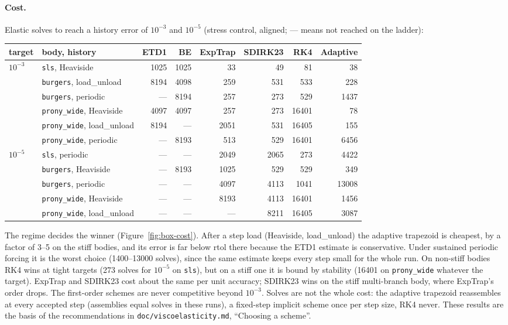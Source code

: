 \documentclass[11pt]{article}
\numberwithin{equation}{section}
\newcommand{\code}[1]{\texttt{#1}}
\begin{document}
\paragraph{Cost.}
Elastic solves to reach a history error of $10^{-3}$ and $10^{-5}$
(stress control, aligned; --- means not reached on the ladder):
\begin{center}
\small
\begin{tabular}{@{}llrrrrrr@{}}
\toprule
target & body, history & ETD1 & BE & ExpTrap & SDIRK23 & RK4 & Adaptive \\
\midrule
$10^{-3}$ & \code{sls}, Heaviside & 1025 & 1025 & 33 & 49 & 81 & 38 \\
 & \code{burgers}, load\_unload & 8194 & 4098 & 259 & 531 & 533 & 228 \\
 & \code{burgers}, periodic & --- & 8194 & 257 & 273 & 529 & 1437 \\
 & \code{prony\_wide}, Heaviside & 4097 & 4097 & 257 & 273 & 16401 & 78 \\
 & \code{prony\_wide}, load\_unload & 8194 & --- & 2051 & 531 & 16405 & 155 \\
 & \code{prony\_wide}, periodic & --- & 8193 & 513 & 529 & 16401 & 6456 \\
\midrule
$10^{-5}$ & \code{sls}, periodic & --- & --- & 2049 & 2065 & 273 & 4422 \\
 & \code{burgers}, Heaviside & --- & 8193 & 1025 & 529 & 529 & 349 \\
 & \code{burgers}, periodic & --- & --- & 4097 & 4113 & 1041 & 13008 \\
 & \code{prony\_wide}, Heaviside & --- & --- & 8193 & 4113 & 16401 & 1456 \\
 & \code{prony\_wide}, load\_unload & --- & --- & --- & 8211 & 16405 & 3087 \\
\bottomrule
\end{tabular}
\end{center}
The regime decides the winner (Figure~\ref{fig:box-cost}). After a step
load (Heaviside, load\_unload) the adaptive trapezoid is cheapest, by a
factor of 3--5 on the stiff bodies, and its error is far below rtol there
because the ETD1 estimate is conservative. Under sustained periodic
forcing it is the worst choice (1400--13000 solves), since the same
estimate keeps every step small for the whole run. On non-stiff bodies
RK4 wins at tight targets (273 solves for $10^{-5}$ on \code{sls}), but on
a stiff one it is bound by stability (16401 on \code{prony\_wide} whatever
the target). ExpTrap and SDIRK23 cost about the same per unit accuracy;
SDIRK23 wins on the stiff multi-branch body, where ExpTrap's order drops.
The first-order schemes are never competitive beyond $10^{-3}$. Solves are
not the whole cost: the adaptive trapezoid reassembles at every accepted
step (assemblies equal solves in these runs), a fixed-step implicit scheme
once per step size, RK4 never. These results are the basis of the
recommendations in \code{doc/viscoelasticity.md}, ``Choosing a scheme''.
\end{document}
